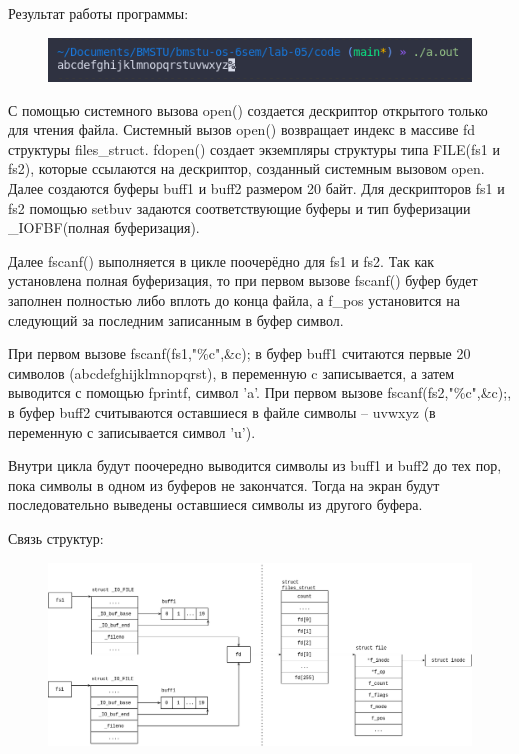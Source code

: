 Результат работы программы:
\begin{figure}[H]
	\centering
	\includegraphics[scale=0.8]{assets/p_1_thread.png}
\end{figure}

С помощью системного вызова open() создается дескриптор открытого только для чтения файла. Системный вызов open() возвращает индекс в массиве fd структуры files\_struct. fdopen() создает экземпляры структуры типа FILE(fs1 и fs2), которые ссылаются на дескриптор, созданный системным вызовом open.
Далее создаются буферы  buff1 и buff2 размером 20 байт. Для дескрипторов fs1 и fs2 помощью setbuv задаются соответствующие буферы и тип буферизации \_IOFBF(полная буферизация).

Далее fscanf() выполняется в цикле поочерёдно для fs1 и  fs2. Так как установлена полная буферизация, то при первом вызове fscanf() буфер будет заполнен полностью либо вплоть до конца файла, а f\_pos установится на следующий за последним записанным в буфер символ.

При первом вызове fscanf(fs1,"\%c",\&c); в буфер buff1 считаются первые 20 символов (abcdefghijklmnopqrst), в переменную c записывается, а затем выводится с помощью fprintf, символ 'a'. При первом вызове fscanf(fs2,"\%c",\&c);, в буфер buff2 считываются оставшиеся в файле символы – uvwxyz (в переменную с записывается символ 'u').  

Внутри цикла будут поочередно выводится символы из buff1 и buff2 до тех пор, пока символы в одном из буферов не закончатся. Тогда на экран будут последовательно выведены оставшиеся символы из другого буфера. 

Связь структур:
\begin{figure}[H]
	\centering
	\includegraphics[scale=0.5]{assets/d_1.png}
\end{figure}


